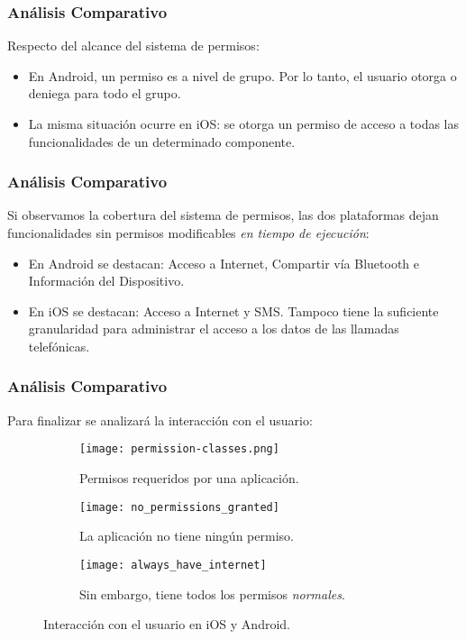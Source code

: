 \begin{frame}
 \frametitle{Análisis Comparativo}
Respecto del alcance del sistema de permisos:\pause
  \begin{itemize}[<+->]
   \item En Android, un permiso es a nivel de grupo. Por lo tanto, el usuario otorga o deniega para todo el grupo.
   \item La misma situación ocurre en iOS: se otorga un permiso de acceso a todas las funcionalidades de un determinado componente.
  \end{itemize}
\end{frame}
\begin{frame}
 \frametitle{Análisis Comparativo}
Si observamos la cobertura del sistema de permisos, \pause las dos plataformas dejan funcionalidades sin permisos modificables \emph{en tiempo de ejecución}:\pause
  \begin{itemize}[<+->]
   \item En Android se destacan: Acceso a Internet, Compartir vía Bluetooth e Información del Dispositivo.
   \item En iOS se destacan: Acceso a Internet y SMS. Tampoco tiene la suficiente granularidad para administrar el acceso a los datos de las llamadas telefónicas.
  \end{itemize}
\end{frame}
\begin{frame}
 \frametitle{Análisis Comparativo}
\small {Para finalizar se analizará la interacción con el usuario:}\pause
\begin{figure}
	\centering
	\begin{subfigure}{.23\linewidth}
		\texttt{[image: permission-classes.png]}
		\caption{Permisos requeridos por una aplicación.}
		\label{fig:ch05:ios_all_permissions}
	\end{subfigure}\pause
	\begin{subfigure}{.23\linewidth}
		\texttt{[image: no\_permissions\_granted]}
		\caption{La aplicación no tiene ningún permiso.}
		\label{fig:ch05:without_permissions}
	\end{subfigure}\pause
	\begin{subfigure}{.23\linewidth}
		\texttt{[image: always\_have\_internet]}
		\caption{Sin embargo, tiene todos los permisos \emph{normales}.}
		\label{fig:ch05:always_have_internet}
	\end{subfigure}
	\caption{Interacción con el usuario en iOS y Android.}
\end{figure}
\end{frame}